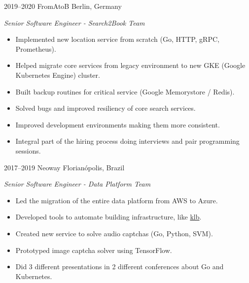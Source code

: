 \documentclass[]{friggeri-cv} %
\begin{document}
\begin{entrylist}
\entry
{2019--2020}
{FromAtoB}
{Berlin, Germany}
{\emph{Senior Software Engineer - Search2Book Team} \\

\begin{itemize}
  \item Implemented new location service from scratch (Go, HTTP, gRPC, Prometheus).
  \item Helped migrate core services from legacy environment to new GKE (Google Kubernetes Engine) cluster.
  \item Built backup routines for critical service (Google Memorystore / Redis).
  \item Solved bugs and improved resiliency of core search services.
  \item Improved development environments making them more consistent.
  \item Integral part of the hiring process doing interviews and pair programming sessions.
\end{itemize}

}
\end{entrylist}

\begin{entrylist}
\entry
{2017--2019}
{Neoway}
{Florianópolis, Brazil}
{\emph{Senior Software Engineer - Data Platform Team} \\

\begin{itemize}
  \item Led the migration of the entire data platform from AWS to Azure.
  \item Developed tools to automate building infrastructure, like {\href{https://github.com/NeowayLabs/klb}{klb}}.
  \item Created new service to solve audio captchas (Go, Python, SVM).
  \item Prototyped image captcha solver using TensorFlow.
  \item Did 3 different presentations in 2 different conferences about Go and Kubernetes.
\end{itemize}
}
\end{entrylist}
\end{document}
